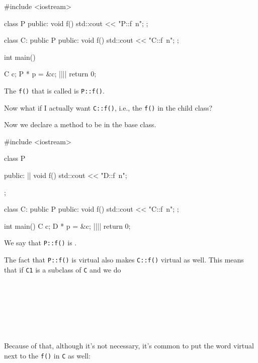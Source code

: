 \begin{consolethree}[escapeinside=||]
#include <iostream>

class P
{
public:
     void f()
     {    
          std::cout << "P::f\ n";
     }
};

class C: public P
{
public:
     void f()
     {    
          std::cout << "C::f\ n";
     }
};

int main()
{   
    C c;
    P * p = &c;
    ||||
    return 0;

}
\end{consolethree}

The \verb!f()! that is called is \verb!P::f()!.

Now what if I actually want \verb!C::f()!, i.e., the \verb!f()! in the child class?

Now we declare a method to be  in the base class.

\begin{consolethree}[escapeinside=||]
#include <iostream>

class P{
public:
     || void f() { std::cout << "D::f\ n"; }

};

class C: public P
{
public:
     void f() { std::cout << "C::f\ n"; }
};

int main()
{   
    C c;
    D * p = &c;
    ||||
    return 0;
}
\end{consolethree}

We say that \verb!P::f()! is .

The fact that \verb!P::f()! is virtual also makes \verb!C::f()! virtual as well. This means that if \verb!C1! is a subclass of \verb!C! and we do

\\
\\
\\
\\
\\
\\

Because of that, although it's not necessary, it's common to put the word virtual next to the \verb!f()! in \verb!C! as well:

